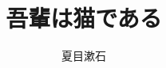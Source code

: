 ﻿\documentclass[a4paper, book, tate, landscape]{jlreq}
\begin{document}
\title{吾輩は猫である}%
\author{夏目漱石}%
\maketitle

\end{document}
